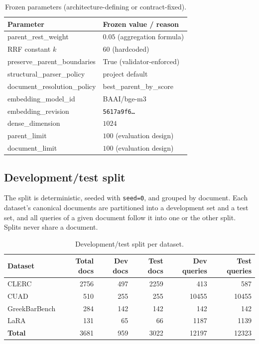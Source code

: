 \documentclass[11pt,a4paper]{article}
\begin{document}
\begin{table}[h]
\centering
\caption{Frozen parameters (architecture-defining or contract-fixed).}
\label{tab:frozen}
\small
\begin{tabular}{l l}
\toprule
\textbf{Parameter} & \textbf{Frozen value / reason} \\
\midrule
parent\_rest\_weight            & $0.05$ (aggregation formula) \\
RRF constant $k$                & $60$ (hardcoded) \\
preserve\_parent\_boundaries    & True (validator-enforced) \\
structural\_parser\_policy      & project default \\
document\_resolution\_policy    & best\_parent\_by\_score \\
embedding\_model\_id            & BAAI/bge-m3 \\
embedding\_revision             & \texttt{5617a9f6\dots} \\
dense\_dimension                & $1024$ \\
parent\_limit                   & $100$ (evaluation design) \\
document\_limit                 & $100$ (evaluation design) \\
\bottomrule
\end{tabular}
\end{table}

\subsection{Development/test split}
The split is deterministic, seeded with \texttt{seed=0}, and grouped
by document. Each dataset's canonical documents are partitioned into
a development set and a test set, and all queries of a given document
follow it into one or the other split. Splits never share a document.

\begin{table}[h]
\centering
\caption{Development/test split per dataset.}
\label{tab:split}
\small
\begin{tabular}{l r r r r r}
\toprule
\textbf{Dataset} & \textbf{Total docs} & \textbf{Dev docs}
  & \textbf{Test docs} & \textbf{Dev queries} & \textbf{Test queries} \\
\midrule
CLERC              & \num{2756} & \num{497}  & \num{2259} & \num{413}   & \num{587} \\
CUAD               & \num{510}  & \num{255}  & \num{255}  & \num{10455} & \num{10455} \\
GreekBarBench      & \num{284}  & \num{142}  & \num{142}  & \num{142}   & \num{142} \\
LaRA               & \num{131}  & \num{65}   & \num{66}   & \num{1187}  & \num{1139} \\
\midrule
\textbf{Total}     & \num{3681} & \num{959}  & \num{3022} & \num{12197} & \num{12323} \\
\bottomrule
\end{tabular}
\end{table}
\end{document}
